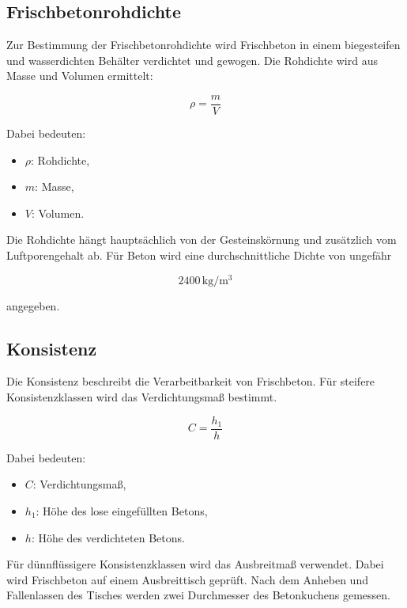 \documentclass[
  12pt,
  a4paper,
  oneside
]{scrreprt}
\begin{document}
\subsection{Frischbetonrohdichte}

Zur Bestimmung der Frischbetonrohdichte wird Frischbeton in einem
biegesteifen und wasserdichten Behälter verdichtet und gewogen. Die
Rohdichte wird aus Masse und Volumen ermittelt:

\begin{equation}
  \rho = \frac{m}{V}
\end{equation}

Dabei bedeuten:

\begin{itemize}
  \item $\rho$: Rohdichte,
  \item $m$: Masse,
  \item $V$: Volumen.
\end{itemize}

Die Rohdichte hängt hauptsächlich von der Gesteinskörnung und zusätzlich
vom Luftporengehalt ab. Für Beton wird eine durchschnittliche Dichte
von ungefähr

\begin{equation}
  2400\,\mathrm{kg/m^3}
\end{equation}

angegeben.


\subsection{Konsistenz}

Die Konsistenz beschreibt die Verarbeitbarkeit von Frischbeton. Für
steifere Konsistenzklassen wird das Verdichtungsmaß bestimmt.

\begin{equation}
  C = \frac{h_1}{h}
\end{equation}

Dabei bedeuten:

\begin{itemize}
  \item $C$: Verdichtungsmaß,
  \item $h_1$: Höhe des lose eingefüllten Betons,
  \item $h$: Höhe des verdichteten Betons.
\end{itemize}



Für dünnflüssigere Konsistenzklassen wird das Ausbreitmaß verwendet.
Dabei wird Frischbeton auf einem Ausbreittisch geprüft. Nach dem
Anheben und Fallenlassen des Tisches werden zwei Durchmesser des
Betonkuchens gemessen.
\end{document}
